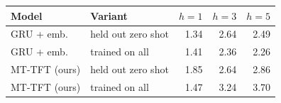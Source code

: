\begin{tabular}{llrrr}
\toprule
Model & Variant & $h{=}1$ & $h{=}3$ & $h{=}5$ \\
\midrule
GRU + emb. & held out zero shot & 1.34 & 2.64 & 2.49 \\
GRU + emb. & trained on all & 1.41 & 2.36 & 2.26 \\
MT-TFT (ours) & held out zero shot & 1.85 & 2.64 & 2.86 \\
MT-TFT (ours) & trained on all & 1.47 & 3.24 & 3.70 \\
\bottomrule
\end{tabular}
